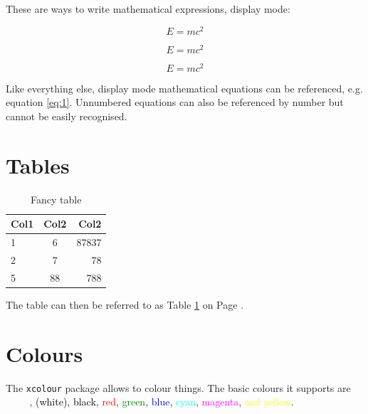 \documentclass[12pt, letterpaper]{article} %
\begin{document}
These are ways to write mathematical expressions, display mode:

\begin{equation} \label{eq:1} %
E=mc^2
\end{equation}

\[E=mc^2\] %

\begin{displaymath} %
E=mc^2
\end{displaymath}


Like everything else, display mode mathematical equations can be referenced, e.g. equation \ref{eq:1}. Unnumbered equations can also be referenced by number but cannot be easily recognised.

\clearpage
\section{Tables} %

\begin{table}[h] %
	\centering %
	\begin{tabular}{|| l | c | r ||} %
		\hline %
		Col1 &	Col2 &	Col2	\\ \hline\hline %
		1	 &	6	 &	87837	\\ \hline
		2	 &	7	 &	78		\\ \hline
		5	 &	88	 &	788 	\\ [1ex] \hline %
	\end{tabular}
	\caption{Fancy table} %
	\label{table:data} %
\end{table}

The table can then be referred to as Table \ref{table:data} on Page \pageref{table:data}.

\section{Colours}

The \texttt{xcolour} package allows to colour things. The basic colours it supports are \textcolor{white}{white}, \textcolor{black}{(white), black}, \textcolor{red}{red}, \textcolor{green}{green}, \textcolor{blue}{blue}, \textcolor{cyan}{cyan}, \textcolor{magenta}{magenta}, \textcolor{yellow}{and yellow}.
\end{document}

